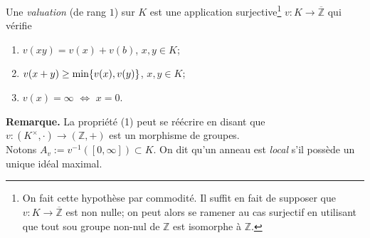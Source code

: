 \documentclass[a4paper, 12pt]{amsart}
\newcommand{\Z}{\mathbb{Z}}
\begin{document}
\subsubsection{}\label{ValDef}Une \textit{valuation} (de rang $1$) sur $K$ est une application surjective\footnote{On fait cette hypothèse par commodité. Il suffit en fait de supposer que $v:K\rightarrow \overline{\Z}$ est non nulle; on peut alors se ramener au cas surjectif en utilisant que  tout sou groupe non-nul de $\Z$ est isomorphe à $\Z$.}
 $v:K\rightarrow \overline{\Z}$  qui vérifie
\begin{enumerate}
\item $v(xy)=v (x)+v (b)$, $x,y\in K$;
\item $v(x+y)\geq \hbox{\rm min}\lbrace v(x),v(y)\rbrace$, $x,y\in K$;
\item $v(x)=\infty$ $\Leftrightarrow$ $x=0$.
\end{enumerate}

\textbf{Remarque.}   La propriété (1) peut se réécrire en disant que $v:(K^\times,\cdot)\rightarrow (\Z,+)$ est un morphisme de groupes.\\

 Notons $A_v:=v^{-1}([0,\infty])\subset K$. On dit qu'un anneau   est \textit{local} s'il possède un unique idéal maximal.
 
\end{document}
